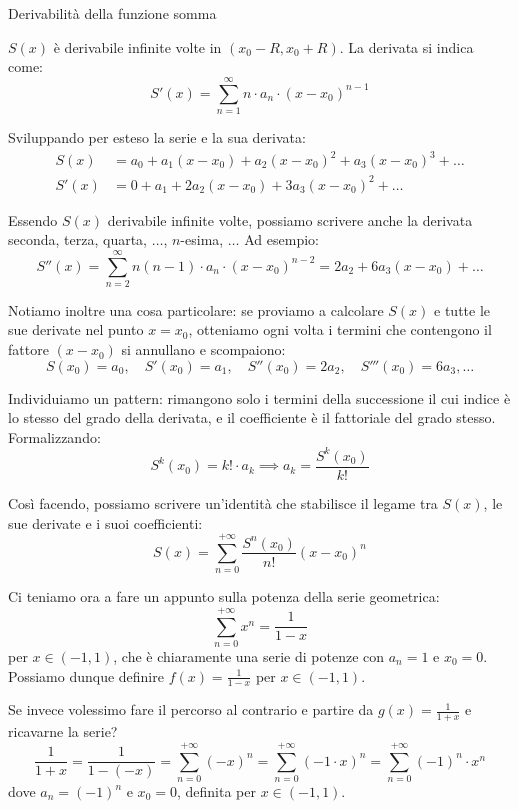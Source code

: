 \documentclass[12pt]{report}
\begin{document}
	\begin{teorema}{Derivabilità della funzione somma}{}
		
		$S(x)$ è derivabile infinite volte in $(x_0 - R, x_0 + R)$.
		La derivata si indica come:
		\[
		S'(x) = \sum_{n=1}^{\infty} n \cdot a_n \cdot (x - x_0)^{n-1}
		\]
		
	\end{teorema}
	
	Sviluppando per esteso la serie e la sua derivata:
	\[
	\begin{aligned}
		S(x) &= a_0 + a_1(x - x_0) + a_2(x - x_0)^2 + a_3(x - x_0)^3 + \dots \\
		S'(x) &= 0 + a_1 + 2a_2(x - x_0) + 3a_3(x - x_0)^2 + \dots
	\end{aligned}
	\]
	
	Essendo $S(x)$ derivabile infinite volte, possiamo scrivere anche la derivata seconda, terza, quarta, $\dots$, $n$-esima, $\dots$
	Ad esempio:
	\[
	S''(x) = \sum_{n=2}^{\infty} n(n-1) \cdot a_n \cdot (x - x_0)^{n-2} = 2a_2 + 6a_3(x - x_0) + \dots
	\]
	
	Notiamo inoltre una cosa particolare: se proviamo a calcolare $S(x)$ e tutte le sue derivate nel punto $x = x_0$, otteniamo ogni volta i termini che contengono il fattore $(x - x_0)$ si annullano e scompaiono:
	\[
	S(x_0) = a_0, \quad S'(x_0) = a_1, \quad S''(x_0) = 2a_2, \quad S'''(x_0) = 6a_3, \dots
	\]
	
	Individuiamo un pattern: rimangono solo i termini della successione il cui indice è lo stesso del grado della derivata, e il coefficiente è il fattoriale del grado stesso. Formalizzando:
	\[
	S^k(x_0) = k! \cdot a_k \implies a_k = \frac{S^k(x_0)}{k!}
	\]
	
	Così facendo, possiamo scrivere un'identità che stabilisce il legame tra $S(x)$, le sue derivate e i suoi coefficienti:
	\[
	S(x) = \sum_{n=0}^{+\infty} \frac{S^n(x_0)}{n!} (x - x_0)^n
	\]
	
	Ci teniamo ora a fare un appunto sulla potenza della serie geometrica:
	\[
	\sum_{n=0}^{+\infty} x^n = \frac{1}{1-x}
	\]
	per $x \in (-1, 1)$, che è chiaramente una serie di potenze con $a_n = 1$ e $x_0 = 0$. Possiamo dunque definire $f(x) = \frac{1}{1-x}$ per $x \in (-1, 1)$.
	
	Se invece volessimo fare il percorso al contrario e partire da $g(x) = \frac{1}{1+x}$ e ricavarne la serie?
	\[
	\frac{1}{1+x} = \frac{1}{1 - (-x)} = \sum_{n=0}^{+\infty} (-x)^n = \sum_{n=0}^{+\infty} (-1 \cdot x)^n = \sum_{n=0}^{+\infty} (-1)^n \cdot x^n
	\]
	dove $a_n = (-1)^n$ e $x_0 = 0$, definita per $x \in (-1, 1)$.
	
\end{document}
